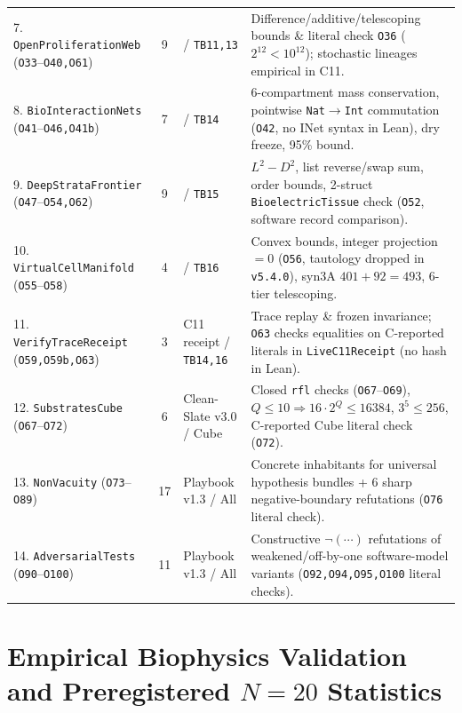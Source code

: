 \documentclass[11pt,reqno]{amsart}
\begin{document}
\begin{table}[t]
\begin{tabularx}{\textwidth}{@{}l c l L@{}}
7. \texttt{OpenProliferationWeb} (\texttt{O33}--\texttt{O40,O61}) & 9 & \cite{lane2010energetics,chen2014architecture} / \texttt{TB11,13} & Difference/additive/telescoping bounds \& literal check \texttt{O36} ($2^{12} < 10^{12}$); stochastic lineages empirical in C11. \\
8. \texttt{BioInteractionNets} (\texttt{O41}--\texttt{O46,O41b}) & 7 & \cite{lafont1990interaction,levin2021bioelectric} / \texttt{TB14} & 6-compartment mass conservation, pointwise \texttt{Nat}$\to$\texttt{Int} commutation (\texttt{O42}, no INet syntax in Lean), dry freeze, 95\% bound. \\
9. \texttt{DeepStrataFrontier} (\texttt{O47}--\texttt{O54,O62}) & 9 & \cite{naaman2019chiral,fudenberg2016formation,nuchter2006nanosecond,ripoll2023neuropeptidergic} / \texttt{TB15} & $L^2-D^2$, list reverse/swap sum, order bounds, 2-struct \texttt{BioelectricTissue} check (\texttt{O52}, software record comparison). \\
10. \texttt{VirtualCellManifold} (\texttt{O55}--\texttt{O58}) & 4 & \cite{breuer2019essential,thornburg2022fundamental} / \texttt{TB16} & Convex bounds, integer projection $= 0$ (\texttt{O56}, tautology dropped in \texttt{v5.4.0}), syn3A $401+92=493$, 6-tier telescoping. \\
11. \texttt{VerifyTraceReceipt} (\texttt{O59,O59b,O63}) & 3 & C11 receipt / \texttt{TB14,16} & Trace replay \& frozen invariance; \texttt{O63} checks equalities on C-reported literals in \texttt{LiveC11Receipt} (no hash in Lean). \\
12. \texttt{SubstratesCube} (\texttt{O67}--\texttt{O72}) & 6 & Clean-Slate v3.0 / Cube & Closed \texttt{rfl} checks (\texttt{O67}--\texttt{O69}), $Q \le 10 \Rightarrow 16\cdot 2^Q \le 16384$, $3^5\le 256$, C-reported Cube literal check (\texttt{O72}). \\
13. \texttt{NonVacuity} (\texttt{O73}--\texttt{O89}) & 17 & Playbook v1.3 / All & Concrete inhabitants for universal hypothesis bundles + 6 sharp negative-boundary refutations (\texttt{O76} literal check). \\
14. \texttt{AdversarialTests} (\texttt{O90}--\texttt{O100}) & 11 & Playbook v1.3 / All & Constructive $\neg(\cdots)$ refutations of weakened/off-by-one software-model variants (\texttt{O92,O94,O95,O100} literal checks). \\
\bottomrule
\end{tabularx}
\end{table}

\section{Empirical Biophysics Validation and Preregistered \texorpdfstring{$N = 20$}{N = 20} Statistics}
\label{sec:empirical}
\end{document}
